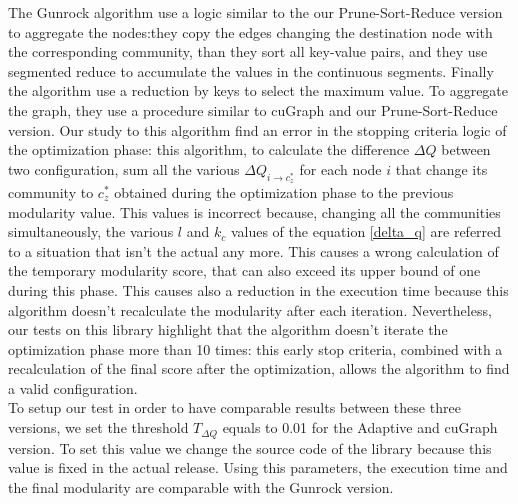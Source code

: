 The Gunrock algorithm use a logic similar to the our Prune-Sort-Reduce version to aggregate the nodes:they copy the edges changing the destination node with the corresponding community, than they sort all key-value pairs, and they use segmented reduce to accumulate the values in the continuous segments. Finally the algorithm use a reduction by keys to select the maximum value. To aggregate the graph, they use a procedure similar to cuGraph and our Prune-Sort-Reduce version. Our study to this algorithm find an error in the stopping criteria logic of the optimization phase: this algorithm, to calculate the difference $\Delta Q$ between two 
configuration, sum all the various $\Delta Q_{i \rightarrow c_z^*}$ for each node $i$ that change its community to $c_z^*$ obtained during the optimization phase to the previous modularity value. This values is incorrect because, changing all the communities simultaneously, the various $l$ and $k_c$ values of the equation \ref{delta_q} are referred to a situation that isn't the actual any more. This causes a wrong calculation of the temporary modularity score, that can also exceed its upper bound of one during this phase. This causes also a reduction in the execution time because this algorithm doesn't recalculate the modularity after each iteration.
Nevertheless, our tests on this library highlight that the algorithm doesn't iterate the optimization phase more than 10 times: this early stop criteria, combined with a recalculation of the final score after the optimization, allows the algorithm to find a valid configuration.\\
To setup our test in order to have comparable results between these three versions, we set the threshold $T_{\Delta Q}$ equals to 0.01 for the Adaptive and cuGraph version. To set this value we change the source code of the library because this value is fixed in the actual release. Using this parameters, the execution time and the final modularity are comparable with the Gunrock version. 
